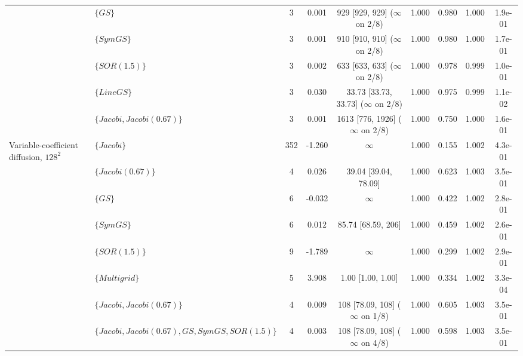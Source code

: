{\begin{tabular}{llccccccc}
 & $\{GS\}$ & 3 & 0.001 & 929 [929, 929] ($\infty$ on 2/8) & 1.000 & 0.980 & 1.000 & 1.9e-01 \\
 & $\{SymGS\}$ & 3 & 0.001 & 910 [910, 910] ($\infty$ on 2/8) & 1.000 & 0.980 & 1.000 & 1.7e-01 \\
 & $\{SOR (1.5)\}$ & 3 & 0.002 & 633 [633, 633] ($\infty$ on 2/8) & 1.000 & 0.978 & 0.999 & 1.0e-01 \\
 & $\{Line GS\}$ & 3 & 0.030 & 33.73 [33.73, 33.73] ($\infty$ on 2/8) & 1.000 & 0.975 & 0.999 & 1.1e-02 \\
 & $\{Jacobi, Jacobi (0.67)\}$ & 3 & 0.001 & 1613 [776, 1926] ($\infty$ on 2/8) & 1.000 & 0.750 & 1.000 & 1.6e-01 \\
\midrule
Variable-coefficient diffusion, $128^2$ & $\{Jacobi\}$ & 352 & -1.260 & $\infty$ & 1.000 & 0.155 & 1.002 & 4.3e-01 \\
 & $\{Jacobi (0.67)\}$ & 4 & 0.026 & 39.04 [39.04, 78.09] & 1.000 & 0.623 & 1.003 & 3.5e-01 \\
 & $\{GS\}$ & 6 & -0.032 & $\infty$ & 1.000 & 0.422 & 1.002 & 2.8e-01 \\
 & $\{SymGS\}$ & 6 & 0.012 & 85.74 [68.59, 206] & 1.000 & 0.459 & 1.002 & 2.6e-01 \\
 & $\{SOR (1.5)\}$ & 9 & -1.789 & $\infty$ & 1.000 & 0.299 & 1.002 & 2.9e-01 \\
 & $\{Multigrid\}$ & 5 & 3.908 & 1.00 [1.00, 1.00] & 1.000 & 0.334 & 1.002 & 3.3e-04 \\
 & $\{Jacobi, Jacobi (0.67)\}$ & 4 & 0.009 & 108 [78.09, 108] ($\infty$ on 1/8) & 1.000 & 0.605 & 1.003 & 3.5e-01 \\
 & $\{Jacobi, Jacobi (0.67), GS, SymGS, SOR (1.5)\}$ & 4 & 0.003 & 108 [78.09, 108] ($\infty$ on 4/8) & 1.000 & 0.598 & 1.003 & 3.5e-01 \\
\bottomrule
\end{tabular}}
\newcommand{\caAlphaHatMed}{0.50}
\newcommand{\caAlphaHatMaxH}{1.001}
\newcommand{\caAlphaBoundMin}{1}
\newcommand{\caAlphaBoundMax}{2086}
\newcommand{\caRhoAMax}{0.999874}
\newcommand{\caRhoSpecMax}{1.000000}
\newcommand{\caRhoTwoGsMax}{1.89}
\newcommand{\caBandMax}{1.3\times 10^{-1}}
\newcommand{\caAlphaHatMax}{1.017}
